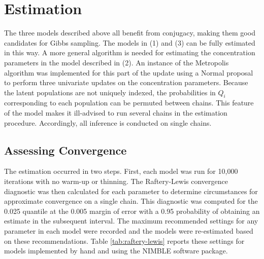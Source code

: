 \documentclass{article}
\begin{document}
\section{Estimation}\label{sec:estimation}
The three models described above all benefit from conjugacy, making them good candidates for Gibbs sampling. The models in (1) and (3) can be fully estimated in this way. A more general algorithm is needed for estimating the concentration parameters in the model described in (2). An instance of the Metropolis algorithm was implemented for this part of the update using a Normal proposal to perform three univariate updates on the concentration parameters. Because the latent populations are not uniquely indexed, the probabilities in $Q_i$ corresponding to each population can be permuted between chains. This feature of the model makes it ill-advised to run several chains in the estimation procedure. Accordingly, all inference is conducted on single chains.

\subsection{Assessing Convergence}

The estimation occurred in two steps. First, each model was run for 10,000 iterations with no warm-up or thinning. The Raftery-Lewis convergence diagnostic was then calculated for each parameter to determine circumstances for approximate convergence on a single chain. This diagnostic was computed for the 0.025 quantile at the 0.005 margin of error with a 0.95 probability of obtaining an estimate in the subsequent interval. The maximum recommended settings for any parameter in each model were recorded and the models were re-estimated based on these recommendations. Table \ref{tab:raftery-lewis} reports these settings for models implemented by hand and using the NIMBLE software package.
\end{document}
